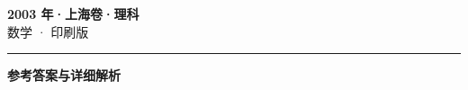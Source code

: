 \documentclass[zihao=5, a4paper]{ctexart}
\begin{document}
\begin{center}
  {\Large\bfseries 2003 年·上海卷·理科}\\[4pt]
  {\large 数学 · 印刷版}
\end{center}
\medskip
{}

\par\bigskip\hrule\bigskip
{}
\begin{center}{\large\bfseries 参考答案与详细解析}\end{center}
\smallskip

\end{document}
